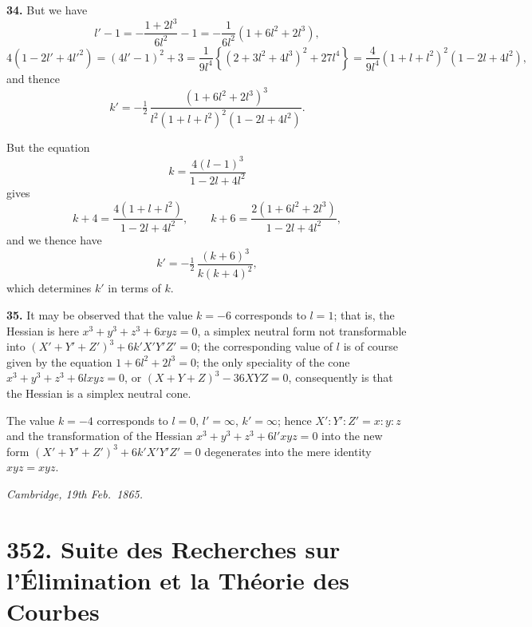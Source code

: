 \documentclass[11pt,a4paper]{article}
\begin{document}
\textbf{34.} But we have
\[
l' - 1 = -\frac{1 + 2l^{3}}{6l^{2}} - 1 = -\frac{1}{6l^{2}}(1 + 6l^{2} + 2l^{3}),
\]
\[
4(1 - 2l' + 4l'^{2}) = (4l' - 1)^{2} + 3 = \frac{1}{9l^{4}}\left\{(2 + 3l^{2} + 4l^{3})^{2} + 27l^{4}\right\} = \frac{4}{9l^{4}}(1 + l + l^{2})^{2}(1 - 2l + 4l^{2}),
\]
and thence
\[
k' = -\tfrac{1}{2}\,\frac{(1 + 6l^{2} + 2l^{3})^{3}}{l^{2}(1 + l + l^{2})^{2}(1 - 2l + 4l^{2})}.
\]

But the equation
\[
k = \frac{4(l - 1)^{3}}{1 - 2l + 4l^{2}}
\]
gives
\[
k + 4 = \frac{4(1 + l + l^{2})}{1 - 2l + 4l^{2}},\qquad k + 6 = \frac{2(1 + 6l^{2} + 2l^{3})}{1 - 2l + 4l^{2}},
\]
and we thence have
\[
k' = -\tfrac{1}{2}\,\frac{(k + 6)^{3}}{k(k + 4)^{2}},
\]
which determines $k'$ in terms of $k$.

\textbf{35.} It may be observed that the value $k = -6$ corresponds to $l = 1$; that is, the Hessian is here $x^{3} + y^{3} + z^{3} + 6xyz = 0$, a simplex neutral form not transformable into $(X' + Y' + Z')^{3} + 6k'X'Y'Z' = 0$; the corresponding value of $l$ is of course given by the equation $1 + 6l^{2} + 2l^{3} = 0$; the only speciality of the cone $x^{3} + y^{3} + z^{3} + 6lxyz = 0$, or $(X + Y + Z)^{3} - 36XYZ = 0$, consequently is that the Hessian is a simplex neutral cone.

The value $k = -4$ corresponds to $l = 0$, $l' = \infty$, $k' = \infty$; hence $X' : Y' : Z' = x : y : z$ and the transformation of the Hessian $x^{3} + y^{3} + z^{3} + 6l'xyz = 0$ into the new form $(X' + Y' + Z')^{3} + 6k'X'Y'Z' = 0$ degenerates into the mere identity $xyz = xyz$.

\medskip
\noindent\hfill\textit{Cambridge, 19th Feb.\ 1865.}\hfill\null

\vspace{2em}

\section*{352. Suite des Recherches sur l'\'Elimination et la Th\'eorie des Courbes}
\end{document}

